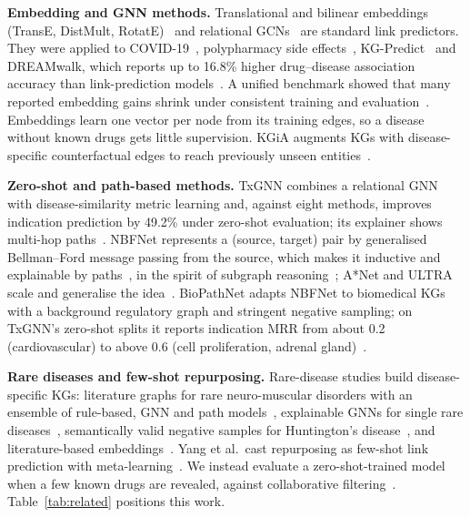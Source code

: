 \documentclass{ieeeaccess}
\begin{document}
\textbf{Embedding and GNN methods.} Translational and bilinear embeddings (TransE, DistMult, RotatE)~\cite{bordes2013transe,yang2015distmult,sun2019rotate} and relational GCNs~\cite{schlichtkrull2018rgcn} are standard link predictors. They were applied to COVID-19~\cite{zhang2021covidkg,morselli2021covid}, polypharmacy side effects~\cite{zitnik2018decagon}, KG-Predict~\cite{gao2022kgpredict} and DREAMwalk, which reports up to 16.8\% higher drug--disease association accuracy than link-prediction models~\cite{bang2023dreamwalk}. A unified benchmark showed that many reported embedding gains shrink under consistent training and evaluation~\cite{ali2021pykeen}. Embeddings learn one vector per node from its training edges, so a disease without known drugs gets little supervision. KGiA augments KGs with disease-specific counterfactual edges to reach previously unseen entities~\cite{oguztuzun2025kgia}.

\textbf{Zero-shot and path-based methods.} TxGNN combines a relational GNN with disease-similarity metric learning and, against eight methods, improves indication prediction by 49.2\% under zero-shot evaluation; its explainer shows multi-hop paths~\cite{huang2024txgnn}. NBFNet represents a (source, target) pair by generalised Bellman--Ford message passing from the source, which makes it inductive and explainable by paths~\cite{zhu2021nbfnet}, in the spirit of subgraph reasoning~\cite{teru2020grail}; A*Net and ULTRA scale and generalise the idea~\cite{zhu2023astarnet,galkin2024ultra}. BioPathNet adapts NBFNet to biomedical KGs with a background regulatory graph and stringent negative sampling; on TxGNN's zero-shot splits it reports indication MRR from about 0.2 (cardiovascular) to above 0.6 (cell proliferation, adrenal gland)~\cite{hu2026biopathnet}.

\textbf{Rare diseases and few-shot repurposing.} Rare-disease studies build disease-specific KGs: literature graphs for rare neuro-muscular disorders with an ensemble of rule-based, GNN and path models~\cite{papadimas2026neuromuscular}, explainable GNNs for single rare diseases~\cite{perdomo2026rdexplainer}, semantically valid negative samples for Huntington's disease~\cite{bianchi2026negatives}, and literature-based embeddings~\cite{sosa2020rare}. Yang et al.\ cast repurposing as few-shot link prediction with meta-learning~\cite{yang2024fewshot}. We instead evaluate a zero-shot-trained model when a few known drugs are revealed, against collaborative filtering~\cite{sarwar2001itemcf}. Table~\ref{tab:related} positions this work.
\end{document}

